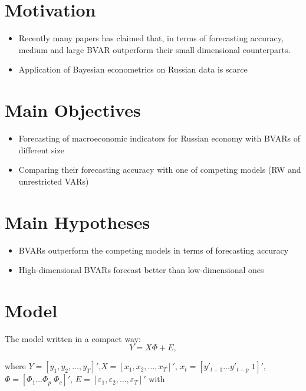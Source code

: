 \documentclass[a0, landscape]{a0poster}
\begin{document}
\begin{multicols}{3}
\color{Black} %

\section*{Motivation}
\begin{itemize}
\item Recently many papers has claimed that, in terms of forecasting accuracy, medium and large BVAR outperform their small dimensional counterparts.
\item Application of Bayesian econometrics on Russian data is scarce
\end{itemize}

\section*{Main Objectives}

\begin{itemize}
\item Forecasting of macroeconomic indicators for Russian economy with BVARs of different size
\item Comparing their forecasting accuracy with one of competing models (RW and unrestricted VARs)
\end{itemize}

\section*{Main Hypotheses}

\begin{itemize}
\item BVARs outperform the competing models in terms of forecasting accuracy
\item High-dimensional BVARs forecast better than low-dimensional ones
\end{itemize}

\section*{Model}
The model written in a compact way:
\begin{equation*}
Y=X\Phi+E,\label{var}
\end{equation*}

where $Y=[y_1, y_2,\ldots, y_T]'$,$X=[x_1, x_2,\ldots, x_T]'$, $x_t=[ y'_{t-1} \ldots  y'_{t-p} \; 1]'$,  $\Phi=[\Phi_1 \ldots \Phi_p \; \Phi_{c}]'$, $E=[\varepsilon_1, \varepsilon_2,\ldots, \varepsilon_T]'$ with\\


\end{multicols}
\end{document}

